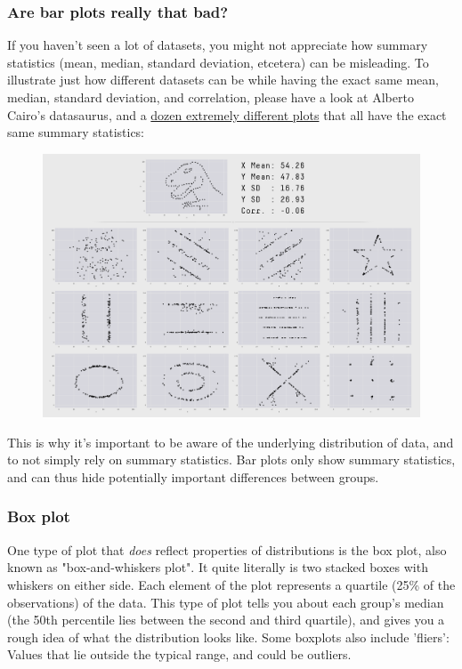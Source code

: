 \documentclass[11pt]{article}
\makeatletter
\def\maxwidth{\ifdim\Gin@nat@width>\linewidth\linewidth
    \else\Gin@nat@width\fi}
\let\Oldincludegraphics\includegraphics
\renewcommand{\includegraphics}[1]{\Oldincludegraphics[width=.8\maxwidth]{#1}}
\makeatother
\begin{document}
    \subsubsection{Are bar plots really that
bad?}\label{are-bar-plots-really-that-bad}

If you haven't seen a lot of datasets, you might not appreciate how
summary statistics (mean, median, standard deviation, etcetera) can be
misleading. To illustrate just how different datasets can be while
having the exact same mean, median, standard deviation, and correlation,
please have a look at Alberto Cairo's datasaurus, and a
\href{https://www.autodeskresearch.com/publications/samestats}{dozen
extremely different plots} that all have the exact same summary
statistics:

\begin{figure}[htbp]
\centering
\includegraphics{datasaurus_alberto_cairo.png}
\caption{}
\end{figure}

This is why it's important to be aware of the underlying distribution of
data, and to not simply rely on summary statistics. Bar plots only show
summary statistics, and can thus hide potentially important differences
between groups.

    \subsubsection{Box plot}\label{box-plot}

One type of plot that \emph{does} reflect properties of distributions is
the box plot, also known as "box-and-whiskers plot". It quite literally
is two stacked boxes with whiskers on either side. Each element of the
plot represents a quartile (25\% of the observations) of the data. This
type of plot tells you about each group's median (the 50th percentile
lies between the second and third quartile), and gives you a rough idea
of what the distribution looks like. Some boxplots also include
'fliers': Values that lie outside the typical range, and could be
outliers.
\end{document}
